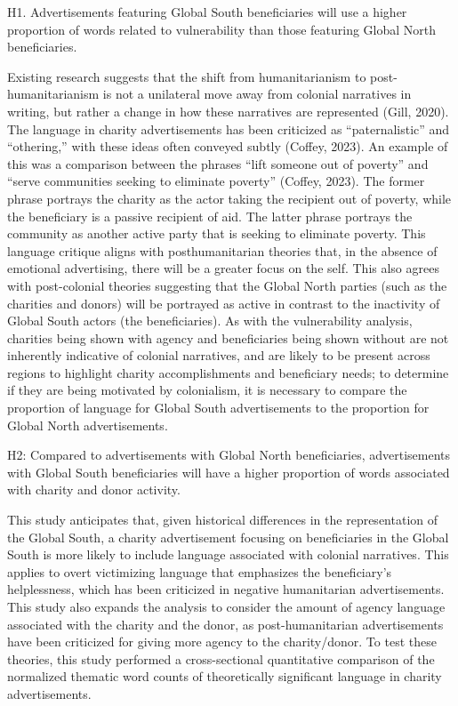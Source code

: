 H1. Advertisements featuring Global South beneficiaries will use a higher proportion of words related to vulnerability than those featuring Global North beneficiaries. 

Existing research suggests that the shift from humanitarianism to post-humanitarianism is not a unilateral move away from colonial narratives in writing, but rather a change in how these narratives are represented (Gill, 2020). The language in charity advertisements has been criticized as “paternalistic” and “othering,” with these ideas often conveyed subtly (Coffey, 2023). An example of this was a comparison between the phrases “lift someone out of poverty” and “serve communities seeking to eliminate poverty” (Coffey, 2023). The former phrase portrays the charity as the actor taking the recipient out of poverty, while the beneficiary is a passive recipient of aid. The latter phrase portrays the community as another active party that is seeking to eliminate poverty. This language critique aligns with posthumanitarian theories that, in the absence of emotional advertising, there will be a greater focus on the self. This also agrees with post-colonial theories suggesting that the Global North parties (such as the charities and donors) will be portrayed as active in contrast to the inactivity of Global South actors (the beneficiaries). As with the vulnerability analysis, charities being shown with agency and beneficiaries being shown without are not inherently indicative of colonial narratives, and are likely to be present across regions to highlight charity accomplishments and beneficiary needs; to determine if they are being motivated by colonialism, it is necessary to compare the proportion of language for Global South advertisements to the proportion for Global North advertisements.

H2: Compared to advertisements with Global North beneficiaries, advertisements with Global South beneficiaries will have a higher proportion of words associated with charity and donor activity.

This study anticipates that, given historical differences in the representation of the Global South, a charity advertisement focusing on beneficiaries in the Global South is more likely to include language associated with colonial narratives. This applies to overt victimizing language that emphasizes the beneficiary's helplessness, which has been criticized in negative humanitarian advertisements. This study also expands the analysis to consider the amount of agency language associated with the charity and the donor, as post-humanitarian advertisements have been criticized for giving more agency to the charity/donor. To test these theories, this study performed a cross-sectional quantitative comparison of the normalized thematic word counts of theoretically significant language in charity advertisements.

